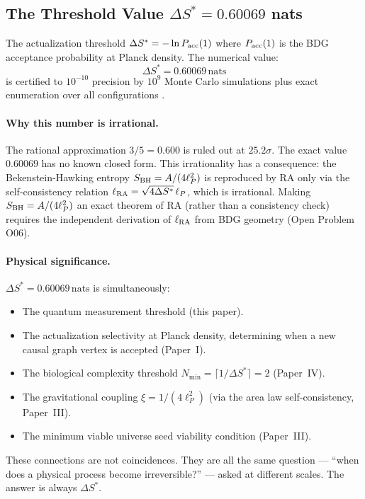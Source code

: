 \documentclass[12pt,a4paper]{article}
\begin{document}
\subsection{The Threshold Value $\Delta S^*=0.60069$ nats}

The actualization threshold $\Delta S^* = -\ln P_{\rm acc}(1)$ where $P_{\rm acc}(1)$ is the BDG acceptance probability at Planck density.  The numerical value:
\begin{equation}
  \Delta S^* = 0.60069\,\mathrm{nats}
  \label{eq:dSstar}
\end{equation}
is certified to $10^{-10}$ precision by $10^9$ Monte Carlo simulations plus exact enumeration over all configurations \statusCV.

\paragraph{Why this number is irrational.}
The rational approximation $3/5=0.600$ is ruled out at $25.2\sigma$.  The exact value $0.60069$ has no known closed form.  This irrationality has a consequence: the Bekenstein-Hawking entropy $S_{\rm BH}=A/(4\ell_P^2)$ is reproduced by RA only via the self-consistency relation $\ell_{\rm RA}=\sqrt{4\Delta S^*}\,\ell_P$, which is irrational.  Making $S_{\rm BH}=A/(4\ell_P^2)$ an exact theorem of RA (rather than a consistency check) requires the independent derivation of $\ell_{\rm RA}$ from BDG geometry (Open Problem O06).

\paragraph{Physical significance.}
$\Delta S^*=0.60069\,\mathrm{nats}$ is simultaneously:
\begin{itemize}
  \item The quantum measurement threshold (this paper).
  \item The actualization selectivity at Planck density, determining when a new causal graph vertex is accepted (Paper~I).
  \item The biological complexity threshold $N_{\min}=\lceil1/\Delta S^*\rceil=2$ (Paper~IV).
  \item The gravitational coupling $\xi=1/(4\ell_P^2)$ (via the area law self-consistency, Paper~III).
  \item The minimum viable universe seed viability condition (Paper~III).
\end{itemize}
These connections are not coincidences.  They are all the same question --- ``when does a physical process become irreversible?'' --- asked at different scales.  The answer is always $\Delta S^*$.
\end{document}
